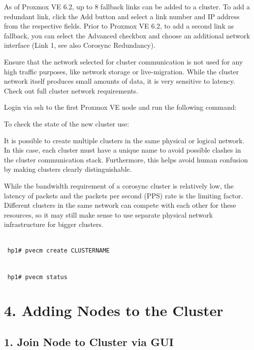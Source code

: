 As of Proxmox VE 6.2, up to 8 fallback links can be added to a cluster. To add a redundant link, click the Add button and select a link number and IP address from the respective fields. Prior to Proxmox VE 6.2, to add a second link as fallback, you can select the Advanced checkbox and choose an additional network interface (Link 1, see also Corosync Redundancy).

Ensure that the network selected for cluster communication is not used for any high traffic purposes, like network storage or live-migration. While the cluster network itself produces small amounts of data, it is very sensitive to latency. Check out full cluster network requirements.

Login via ssh to the first Proxmox VE node and run the following command:

To check the state of the new cluster use:

It is possible to create multiple clusters in the same physical or logical network. In this case, each cluster must have a unique name to avoid possible clashes in the cluster communication stack. Furthermore, this helps avoid human confusion by making clusters clearly distinguishable.

While the bandwidth requirement of a corosync cluster is relatively low, the latency of packets and the packets per second (PPS) rate is the limiting factor. Different clusters in the same network can compete with each other for these resources, so it may still make sense to use separate physical network infrastructure for bigger clusters.

\begin{lstlisting}

 hp1# pvecm create CLUSTERNAME

\end{lstlisting}

\begin{lstlisting}

 hp1# pvecm status

\end{lstlisting}


\section{4. Adding Nodes to the Cluster}

\subsection{1. Join Node to Cluster via GUI}


